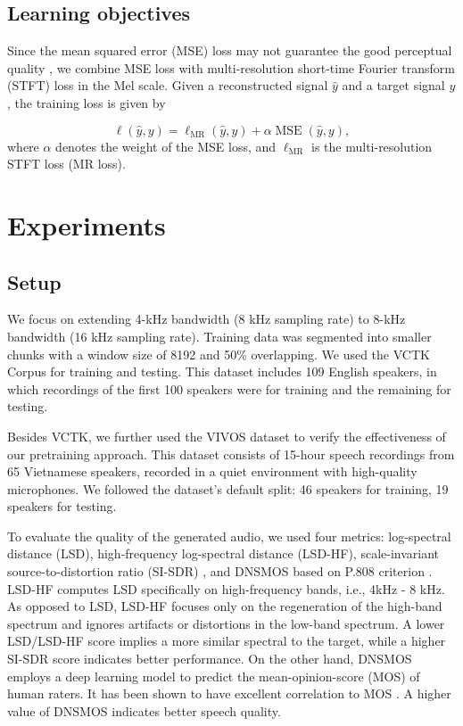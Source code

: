 \documentclass{article}
\begin{document}
\subsection{Learning objectives}
Since the mean squared error (MSE) loss may not guarantee the good perceptual quality \cite{perceptual2}, we combine MSE loss with multi-resolution short-time Fourier transform (STFT) loss \cite{mulres} in the Mel scale. Given a reconstructed signal $\hat{y}$ and a target signal $y$, the training loss is given by \vspace{-0.3cm}

\begin{equation}
\label{eq:loss}
\ell(\hat{y}, y)=\ell_{\mathrm{MR}}(\hat{y}, y) + \alpha\operatorname{MSE}(\hat{y}, y) ,
\end{equation}
\noindent
where $\alpha$ denotes the weight of the MSE loss, and $\ell_{\mathrm{MR}}$ is the multi-resolution STFT loss (MR loss).
\vspace{-0.4cm}


\section{Experiments}
\label{sec:experiments}
\vspace{-0.4cm}
\subsection{Setup}
\vspace{-0.1cm}
We focus on extending 4-kHz bandwidth (8 kHz sampling rate) to 8-kHz bandwidth (16 kHz sampling rate). Training data was segmented into smaller chunks with a window size of 8192 and 50\% overlapping. We used the VCTK Corpus \cite{Veaux2017CSTRVC} for training and testing. This dataset includes 109 English speakers, in which recordings of the first 100 speakers were for training and the remaining for testing.

Besides VCTK, we further used the VIVOS dataset \cite{vivos} to verify the effectiveness of our pretraining approach. This dataset consists of 15-hour speech recordings from 65 Vietnamese speakers, recorded in a quiet environment with high-quality microphones. We followed the dataset's default split: 46 speakers for training, 19 speakers for testing. 

To evaluate the quality of the generated audio, we used four metrics: log-spectral distance (LSD), high-frequency log-spectral distance (LSD-HF), scale-invariant source-to-distortion ratio (SI-SDR) \cite{LeRoux2019SDRH}, and DNSMOS based on P.808 criterion \cite{dnsmos}. LSD-HF computes LSD specifically on high-frequency bands, i.e., 4kHz - 8 kHz. As opposed to LSD, LSD-HF focuses only on the regeneration of the high-band spectrum and ignores artifacts or distortions in the low-band spectrum. A lower LSD/LSD-HF score implies a more similar spectral to the target, while a higher SI-SDR score indicates better performance. On the other hand, DNSMOS employs a deep learning model to predict the mean-opinion-score (MOS) of human raters. It has been shown to have excellent correlation to MOS \cite{dnsmos}. A higher value of DNSMOS indicates better speech quality.
\end{document}
